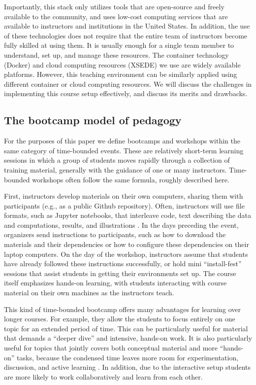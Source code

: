 Importantly, this stack only utilizes tools that are
open-source and freely available to
the community, and uses low-cost computing services that are available
to instructors and institutions in the United States. In addition, the
use of these technologies does not require that the entire
team of instructors become fully skilled at using them. It is
usually enough for a single team member to understand, set up, and manage these resources. The container technology (Docker) and cloud
computing resources (XSEDE) we use are widely available platforms.
However, this teaching environment can be similarly applied using
different container or cloud computing resources.
We will discuss the challenges in implementing this course
setup effectively, and discuss its merits and drawbacks.

\subsection{The bootcamp model of pedagogy}

For the purposes of this paper we define bootcamps and workshops within
the same category of time-bounded events. These are relatively short-term
learning sessions in which a group of students moves rapidly through a
collection of training material, generally with the guidance of one
or many instructors. Time-bounded workshops often follow the same
formula, roughly described here.

First, instructors develop materials on their own computers, sharing them with
participants (e.g., as a public Github repository). Often, instructors will use
file formats, such as Jupyter notebooks, that
interleave code, text describing the
data and computations, results, and illustrations
\cite{kluyver2016jupyter}. In the days preceding the event, organizers send
instructions to participants, such as how to download the materials and their
dependencies or how to configure these dependencies on their
laptop computers. On the day of the workshop, instructors assume that
students have already followed these instructions successfully, or hold
mini ``install-fest'' sessions that assist students in
getting their environments set up. The course itself emphasizes hands-on
learning, with students interacting with course material on their own
machines as the instructors teach.

This kind of time-bounded bootcamp offers many advantages for learning over
longer courses. For example, they allow the students to focus
entirely on one topic for an extended period of time. This can be particularly
useful for material that demands a ``deeper dive'' and intensive, hands-on
work. It is also particularly useful for topics that jointly
covers both conceptual material and more ``hands-on'' tasks, because the
condensed time leaves more room for experimentation, discussion, and active
learning \citep{Bransford2000-lu, Papert1980-fh}. In addition, due to the
interactive setup students are more likely to work collaboratively and learn
from each other.

